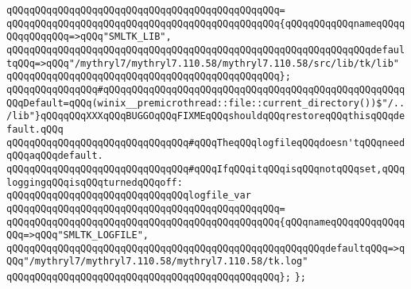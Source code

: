 \verb|qQQqqQQqqQQqqQQqqQQqqQQqqQQqqQQqqQQqqQQqqQQqqQQq=|\newline
\verb|qQQqqQQqqQQqqQQqqQQqqQQqqQQqqQQqqQQqqQQqqQQqqQQq{qQQqqQQqqQQqnameqQQqqQQqqQQqqQQq=>qQQq"SMLTK_LIB",|\newline
\verb|qQQqqQQqqQQqqQQqqQQqqQQqqQQqqQQqqQQqqQQqqQQqqQQqqQQqqQQqqQQqqQQqdefaultqQQq=>qQQq"/mythryl7/mythryl7.110.58/mythryl7.110.58/src/lib/tk/lib"|\newline
\verb|qQQqqQQqqQQqqQQqqQQqqQQqqQQqqQQqqQQqqQQqqQQqqQQq};|\newline
\verb|qQQqqQQqqQQqqQQq#qQQqqQQqqQQqqQQqqQQqqQQqqQQqqQQqqQQqqQQqqQQqqQQqqQQqqQQqDefault=qQQq(winix__premicrothread::file::current_directory())$"/../lib"}qQQqqQQqXXXqQQqBUGGOqQQqFIXMEqQQqshouldqQQqrestoreqQQqthisqQQqdefault.qQQq|\newline
\newline
\newline
\verb|qQQqqQQqqQQqqQQqqQQqqQQqqQQqqQQq#qQQqTheqQQqlogfileqQQqdoesn'tqQQqneedqQQqaqQQqdefault.|\newline
\verb|qQQqqQQqqQQqqQQqqQQqqQQqqQQqqQQq#qQQqIfqQQqitqQQqisqQQqnotqQQqset,qQQqloggingqQQqisqQQqturnedqQQqoff:|\newline
\newline
\verb|qQQqqQQqqQQqqQQqqQQqqQQqqQQqqQQqlogfile_var|\newline
\verb|qQQqqQQqqQQqqQQqqQQqqQQqqQQqqQQqqQQqqQQqqQQqqQQq=|\newline
\verb|qQQqqQQqqQQqqQQqqQQqqQQqqQQqqQQqqQQqqQQqqQQqqQQq{qQQqnameqQQqqQQqqQQqqQQq=>qQQq"SMLTK_LOGFILE",|\newline
\verb|qQQqqQQqqQQqqQQqqQQqqQQqqQQqqQQqqQQqqQQqqQQqqQQqqQQqqQQqdefaultqQQq=>qQQq"/mythryl7/mythryl7.110.58/mythryl7.110.58/tk.log"|\newline
\verb|qQQqqQQqqQQqqQQqqQQqqQQqqQQqqQQqqQQqqQQqqQQqqQQq};|\newline
\newline
\verb|};|\newline


